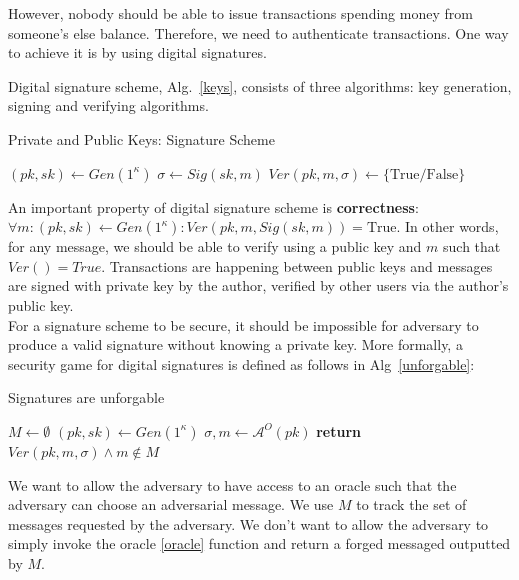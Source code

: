 However, nobody should be able to issue transactions spending money from someone's else balance. Therefore, we need to authenticate transactions. One way to achieve it is by using digital signatures.

Digital signature scheme, Alg.~\ref{keys},  consists of three algorithms: key generation, signing and verifying algorithms.
\begin{algorithm}
\caption{Private and Public Keys: Signature Scheme}
\label{keys}
\begin{algorithmic}[1]
    \State $(pk, sk) \leftarrow Gen(1^\kappa)$
    \State $\sigma \leftarrow Sig(sk, m)$
    \State $Ver(pk, m, \sigma) \leftarrow \{\text{True}/\text{False}\}$
\end{algorithmic}
\end{algorithm}

An important property of digital signature scheme is \textbf{correctness}: $\forall m : (pk, sk) \leftarrow Gen(1^{\kappa}) : Ver(pk, m, Sig(sk, m)) = \text{True}$. In other words, for any message, we should be able to verify using a public key and $m$ such that $Ver() = True$. Transactions are happening between public keys and messages are signed with private key by the author, verified by other users via the author's public key. \\

For a signature scheme to be secure, it should be impossible for adversary to produce a valid signature without knowing a private key. More formally,
a security game for digital signatures is defined as follows in Alg~\ref{unforgable}:
\begin{algorithm}
\caption{Signatures are unforgable}
\label{unforgable}
\begin{algorithmic}[1]
    \State $M \leftarrow \emptyset$
    \State $(pk, sk) \leftarrow Gen(1^\kappa)$
    \State $\sigma, m \leftarrow \mathcal{A}^O(pk)$
    \State \textbf{return} $Ver(pk, m, \sigma) \wedge m \notin M$
\EndFunction
\end{algorithmic}
\end{algorithm}

We want to allow the adversary to have access to an oracle such that the adversary can choose an adversarial message. We use $M$ to track the set of messages requested by the adversary. We don't want to allow the adversary to simply invoke the oracle \ref{oracle} function and return a forged messaged outputted by $M$.


